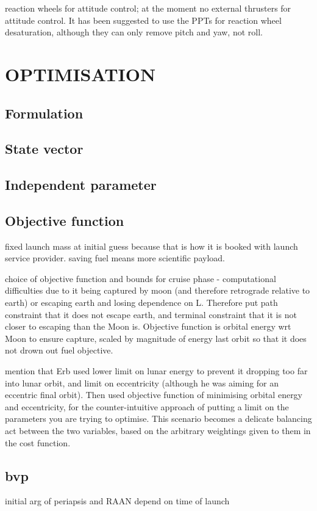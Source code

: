 reaction wheels for attitude control; at the moment no external thrusters for attitude control. It has been suggested to use the PPTs for reaction wheel desaturation, although they can only remove pitch and yaw, not roll.

\section{OPTIMISATION}
\subsection{Formulation}
\subsection{State vector}
\subsection{Independent parameter}
\subsection{Objective function}
fixed launch mass at initial guess because that is how it is booked with launch service provider. saving fuel means more scientific payload.

choice of objective function and bounds for cruise phase - computational difficulties due to it being captured by moon (and therefore retrograde relative to earth) or escaping earth and losing dependence on L. Therefore put path constraint that it does not escape earth, and terminal constraint that it is not closer to escaping than the Moon is. Objective function is orbital energy wrt Moon to ensure capture, scaled by magnitude of energy last orbit so that it does not drown out fuel objective.

mention that Erb used lower limit on lunar energy to prevent it dropping too far into lunar orbit, and limit on eccentricity (although he was aiming for an eccentric final orbit). Then used objective function of minimising orbital energy and eccentricity, for the counter-intuitive approach of putting a limit on the parameters you are trying to optimise. This scenario becomes a delicate balancing act between the two variables, based on the arbitrary weightings given to them in the cost function.

\subsection{bvp}
initial arg of periapsis and RAAN depend on time of launch

